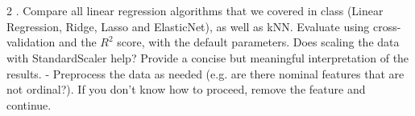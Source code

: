 \documentclass[11pt]{article}
\begin{document}
    \begin{center}
    \end{center}
    { \hspace*{\fill} \\}
    
    \begin{center}
    \end{center}
    { \hspace*{\fill} \\}
    
    \begin{center}
    \end{center}
    { \hspace*{\fill} \\}
    
    \begin{center}
    \end{center}
    { \hspace*{\fill} \\}
    
    \begin{center}
    \end{center}
    { \hspace*{\fill} \\}
    
    \begin{center}
    \end{center}
    { \hspace*{\fill} \\}
    
    \begin{center}
    \end{center}
    { \hspace*{\fill} \\}
    
    2 . Compare all linear regression algorithms that we covered in class
(Linear Regression, Ridge, Lasso and ElasticNet), as well as kNN.
Evaluate using cross-validation and the \(R^2\) score, with the default
parameters. Does scaling the data with StandardScaler help? Provide a
concise but meaningful interpretation of the results. - Preprocess the
data as needed (e.g. are there nominal features that are not ordinal?).
If you don't know how to proceed, remove the feature and continue.
\end{document}
